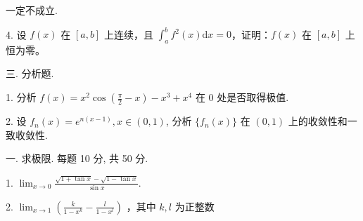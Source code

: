 \documentclass{examcollection}
\begin{document}
{\begin{minipage}{\textwidth}
一定不成立.\par
4. 设 $f(x)$ 在 $[a, b]$ 上连续，且 $\int_{a}^{b} f^{2}(x) \mathrm{d}x = 0$，证明：$f(x)$ 在 $[a, b]$ 上恒为零。\par
三. 分析题.\par
1. 分析 $f(x) = x^{2} \cos \left( \frac{\pi}{2} - x \right) - x^{3} + x^{4}$ 在 0 处是否取得极值.\par
2. 设 $f_{n}(x) = e^{n(x - 1)}, x \in (0,1)$, 分析 $\{f_{n}(x)\}$ 在 $(0,1)$ 上的收敛性和一致收敛性.\par
{}\smallskip
一. 求极限. 每题 10 分, 共 50 分.\par
1. $\lim_{x\to 0}\frac{\sqrt{1 + \tan x} - \sqrt{1 - \tan x}}{\sin x}.$\par
2. $\lim_{x\to 1}\left(\frac{k}{1 - x^k} -\frac{l}{1 - x^l}\right)$ ，其中 $k,l$ 为正整数\par
\end{minipage}}
\ifdim\dimexpr\ht\proofbox+\dp\proofbox\relax>\textheight
\noindent\resizebox{!}{\textheight}{\usebox{\proofbox}}\else\noindent\usebox{\proofbox}\fi\clearpage
\end{document}
